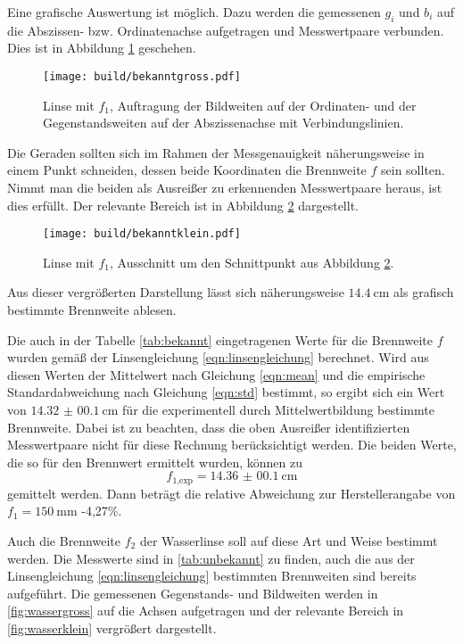 Eine grafische Auswertung ist möglich. Dazu werden die gemessenen $g_i$ und
$b_i$ auf die Abszissen- bzw. Ordinatenachse aufgetragen und Messwertpaare verbunden.
Dies ist in Abbildung \ref{fig:bekanntgross} geschehen.

\begin{figure}%
  \centering
  \texttt{[image: build/bekanntgross.pdf]}
  \caption{Linse mit $f_1$, Auftragung der Bildweiten auf der Ordinaten- und der Gegenstandsweiten auf der Abszissenachse mit Verbindungslinien.}
  \label{fig:bekanntgross}
\end{figure}

Die Geraden sollten sich im Rahmen der Messgenauigkeit näherungsweise in einem Punkt
schneiden, dessen beide Koordinaten die Brennweite $f$ sein sollten. Nimmt man die
beiden als Ausreißer zu erkennenden Messwertpaare heraus, ist dies
erfüllt. Der relevante Bereich ist in Abbildung \ref{fig:bekanntklein} dargestellt.

\begin{figure}%
  \centering
  \texttt{[image: build/bekanntklein.pdf]}
  \caption{Linse mit $f_1$, Ausschnitt um den Schnittpunkt aus Abbildung \ref{fig:bekanntklein}.}
  \label{fig:bekanntklein}
\end{figure}

Aus dieser vergrößerten Darstellung lässt sich näherungsweise $\SI{14.4}{\centi\meter}$ als grafisch
bestimmte Brennweite ablesen.

Die auch in der Tabelle \ref{tab:bekannt} eingetragenen Werte für die Brennweite $f$ wurden gemäß der
Linsengleichung \eqref{eqn:linsengleichung} berechnet. Wird aus diesen Werten
der Mittelwert nach Gleichung \eqref{eqn:mean} und die empirische Standardabweichung
nach Gleichung \eqref{eqn:std} bestimmt, so ergibt sich ein Wert von $\SI{14.32(0010)}{\centi\meter}$
für die experimentell durch Mittelwertbildung bestimmte Brennweite. Dabei ist zu
beachten, dass die oben Ausreißer identifizierten Messwertpaare nicht für diese Rechnung
berücksichtigt werden. Die beiden Werte, die so für den Brennwert ermittelt wurden,
können zu
\begin{equation*}
  f_{\text{1,exp}} = \SI{14.36(0010)}{\centi\meter}
\end{equation*}
gemittelt werden. Dann beträgt die relative Abweichung zur Herstellerangabe von
$f_1 = \SI{150}{\milli\meter}$ -4,27\%.

Auch die Brennweite $f_2$ der Wasserlinse soll auf diese Art und Weise bestimmt werden.
Die Messwerte sind in \ref{tab:unbekannt} zu finden, auch die aus der Linsengleichung \eqref{eqn:linsengleichung}
bestimmten Brennweiten sind bereits aufgeführt.
Die gemessenen Gegenstands- und Bildweiten werden in \ref{fig:wassergross} auf die Achsen aufgetragen
und der relevante Bereich in \ref{fig:wasserklein} vergrößert dargestellt.

